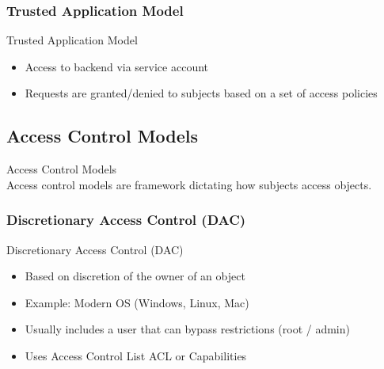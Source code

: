 \subsubsection{Trusted Application Model}

\begin{definition}{Trusted Application Model}\\
    \begin{itemize}
        \item Access to backend via service account
        \item Requests are granted/denied to subjects based on a set of access policies
    \end{itemize}
    
\end{definition}

\subsection{Access Control Models}

\begin{concept}{Access Control Models}\\
    Access control models are framework dictating how subjects access objects.
\end{concept}

\subsubsection{Discretionary Access Control (DAC)}

\begin{definition}{Discretionary Access Control (DAC)}\\
    \begin{itemize}
        \item Based on discretion of the owner of an object
        \item Example: Modern OS (Windows, Linux, Mac)
        \item Usually includes a user that can bypass restrictions (root / admin)
        \item Uses Access Control List ACL or Capabilities
    \end{itemize}
    
\end{definition}

